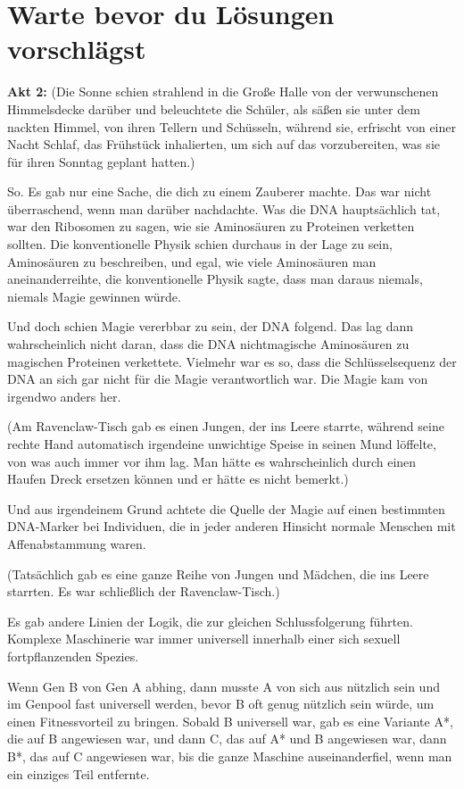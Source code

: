 \chapter{Warte bevor du Lösungen vorschlägst}

\textbf{Akt 2: }
(Die Sonne schien strahlend in die Große Halle von der verwunschenen
Himmelsdecke darüber und beleuchtete die Schüler, als säßen sie unter dem
nackten Himmel, von ihren Tellern und Schüsseln, während sie, erfrischt von
einer Nacht Schlaf, das Frühstück inhalierten, um sich auf das vorzubereiten,
was sie für ihren Sonntag geplant hatten.)

So. Es gab nur eine Sache, die dich zu einem Zauberer machte. Das war nicht
überraschend, wenn man darüber nachdachte. Was die DNA hauptsächlich tat, war
den Ribosomen zu sagen, wie sie Aminosäuren zu Proteinen verketten sollten. Die
konventionelle Physik schien durchaus in der Lage zu sein, Aminosäuren zu
beschreiben, und egal, wie viele Aminosäuren man aneinanderreihte, die
konventionelle Physik sagte, dass man daraus niemals, niemals Magie gewinnen
würde.

Und doch schien Magie vererbbar zu sein, der DNA folgend. Das lag dann
wahrscheinlich nicht daran, dass die DNA nichtmagische Aminosäuren zu magischen
Proteinen verkettete. Vielmehr war es so, dass die Schlüsselsequenz der DNA an
sich gar nicht für die Magie verantwortlich war. Die Magie kam von irgendwo
anders her.

(Am Ravenclaw-Tisch gab es einen Jungen, der ins Leere starrte, während seine
rechte Hand automatisch irgendeine unwichtige Speise in seinen Mund löffelte,
von was auch immer vor ihm lag. Man hätte es wahrscheinlich durch einen Haufen
Dreck ersetzen können und er hätte es nicht bemerkt.)

Und aus irgendeinem Grund achtete die Quelle der Magie auf einen bestimmten
DNA-Marker bei Individuen, die in jeder anderen Hinsicht normale Menschen mit
Affenabstammung waren.

(Tatsächlich gab es eine ganze Reihe von Jungen und Mädchen, die ins Leere
starrten. Es war schließlich der Ravenclaw-Tisch.)

Es gab andere Linien der Logik, die zur gleichen Schlussfolgerung führten.
Komplexe Maschinerie war immer universell innerhalb einer sich sexuell
fortpflanzenden Spezies.

Wenn Gen B von Gen A abhing, dann musste A von sich aus nützlich sein und im
Genpool fast universell werden, bevor B oft genug nützlich sein würde, um einen
Fitnessvorteil zu bringen. Sobald B universell war, gab es eine Variante A*, die
auf B angewiesen war, und dann C, das auf A* und B angewiesen war, dann B*, das
auf C angewiesen war, bis die ganze Maschine auseinanderfiel, wenn man ein
einziges Teil entfernte.

